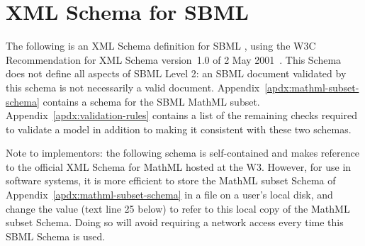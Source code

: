 
\section{XML Schema for SBML}
\label{apdx:schema}

The following is an XML Schema definition for SBML \thisLV, using
the W3C Recommendation for XML Schema version~1.0 of 2 May
2001~\citep{biron:2000,fallside:2000,thompson:2000}.  This Schema
does not define all aspects of SBML Level 2: an SBML document
validated by this schema is not necessarily a valid \sbmltwo
document.  Appendix~\ref{apdx:mathml-subset-schema} contains a
schema for the SBML MathML subset.
Appendix~\ref{apdx:validation-rules} contains a list of the
remaining checks required to validate a model in addition
to making it consistent with these two schemas.

Note to implementors: the following schema is
self-contained and makes reference to the official XML Schema for
MathML hosted at the W3.  However, for use in software systems, it
is more efficient to store the MathML subset Schema of
Appendix~\ref{apdx:mathml-subset-schema} in a file on a user's
local disk, and change the  value
(text line 25 below)
to refer to this local copy of the MathML subset Schema.
Doing so will avoid requiring a network access every time this
SBML Schema is used.

